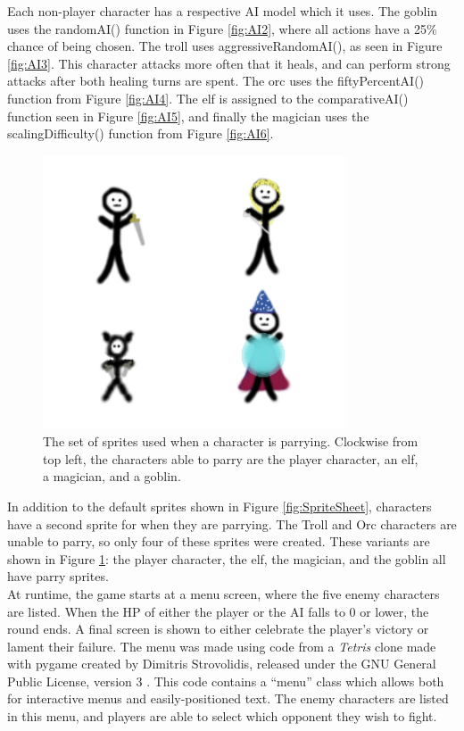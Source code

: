 Each non-player character has a respective AI model which it uses. The goblin uses the randomAI() function in Figure \ref{fig:AI2}, where all actions have a 25\% chance of being chosen. The troll uses aggressiveRandomAI(), as seen in Figure \ref{fig:AI3}. This character attacks more often that it heals, and can perform strong attacks after both healing turns are spent. The orc uses the fiftyPercentAI() function from Figure \ref{fig:AI4}. The elf is assigned to the comparativeAI() function seen in Figure \ref{fig:AI5}, and finally the magician uses the scalingDifficulty() function from Figure \ref{fig:AI6}.

\begin{figure}[H]
  \centering
  \includegraphics[width=9cm]{sprites/ParrySheet.png}
  \caption{The set of sprites used when a character is parrying. Clockwise from top left, the characters able to parry are the player character, an elf, a magician, and a goblin.}
  \label{fig:ParrySheet}
\end{figure}

In addition to the default sprites shown in Figure \ref{fig:SpriteSheet}, characters have a second sprite for when they are parrying. The Troll and Orc characters are unable to parry, so only four of these sprites were created. These variants are shown in Figure \ref{fig:ParrySheet}: the player character, the elf, the magician, and the goblin all have parry sprites.\\

At runtime, the game starts at a menu screen, where the five enemy characters are listed. When the HP of either the player or the AI falls to 0 or lower, the round ends. A final screen is shown to either celebrate the player's victory or lament their failure. The menu was made using code from a \textit{Tetris} clone made with pygame created by Dimitris Strovolidis, released under the GNU General Public License, version 3 \cite{tetris}. This code contains a ``menu'' class which allows both for interactive menus and easily-positioned text. The enemy characters are listed in this menu, and players are able to select which opponent they wish to fight.

